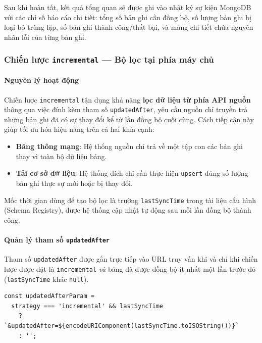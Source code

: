 Sau khi hoàn tất, kết quả tổng quan sẽ được ghi vào nhật ký sự kiện MongoDB với các chỉ số báo cáo chi tiết: tổng số bản ghi cần đồng bộ, số lượng bản ghi bị loại bỏ trùng lặp, số bản ghi thành công/thất bại, và mảng chi tiết chứa nguyên nhân lỗi của từng bản ghi.

\subsubsection{Chiến lược \texttt{incremental} — Bộ lọc tại phía máy chủ}
\label{sec:strategy-incremental}

\paragraph{Nguyên lý hoạt động}

Chiến lược \texttt{incremental} tận dụng khả năng \textbf{lọc dữ liệu từ phía API nguồn} thông qua việc đính kèm tham số \texttt{updatedAfter}, yêu cầu nguồn chỉ truyền trả những bản ghi đã có sự thay đổi kể từ lần đồng bộ cuối cùng. Cách tiếp cận này giúp tối ưu hóa hiệu năng trên cả hai khía cạnh:

\begin{itemize}
  \item \textbf{Băng thông mạng}: Hệ thống nguồn chỉ trả về một tập con các bản ghi thay vì toàn bộ dữ liệu bảng.
  \item \textbf{Tải cơ sở dữ liệu}: Hệ thống đích chỉ cần thực hiện \texttt{upsert} đúng số lượng bản ghi thực sự mới hoặc bị thay đổi.
\end{itemize}

Mốc thời gian dùng để tạo bộ lọc là trường \texttt{lastSyncTime} trong tài liệu cấu hình (Schema Registry), được hệ thống cập nhật tự động sau mỗi lần đồng bộ thành công.

\paragraph{Quản lý tham số \texttt{updatedAfter}}

Tham số \texttt{updatedAfter} được gắn trực tiếp vào URL truy vấn khi và chỉ khi chiến lược được đặt là \texttt{incremental} \textit{và} bảng đã được đồng bộ ít nhất một lần trước đó (\texttt{lastSyncTime} khác \texttt{null}).

\begin{lstlisting}[caption={Thêm \texttt{updatedAfter} vào URL phân trang},
  label={lst:updateafter-url}]
const updatedAfterParam =
  strategy === 'incremental' && lastSyncTime
    ? `&updatedAfter=${encodeURIComponent(lastSyncTime.toISOString())}`
    : '';
\end{lstlisting}

